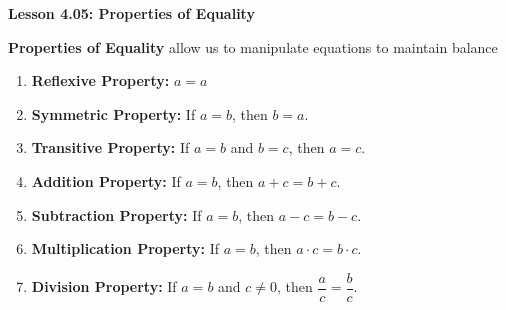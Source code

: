 \begin{center}
\textbf{Lesson 4.05: Properties of Equality}
\end{center}

\vspace*{-1.5ex}

\noindent \textbf{Properties of Equality} allow us to manipulate equations to maintain balance

\begin{enumerate}
    \item \textbf{Reflexive Property:} \(a = a\)  
    \item \textbf{Symmetric Property:} If \(a = b\), then \(b = a\).  
    \item \textbf{Transitive Property:} If \(a = b\) and \(b = c\), then \(a = c\).  
    \item \textbf{Addition Property:} If \(a = b\), then \(a + c = b + c\).  
    \item \textbf{Subtraction Property:} If \(a = b\), then \(a - c = b - c\).  
    \item \textbf{Multiplication Property:} If \(a = b\), then \(a \cdot c = b \cdot c\).  
    \item \textbf{Division Property:} If \(a = b\) and \(c \neq 0\), then \(\dfrac{a}{c} = \dfrac{b}{c}\).
\end{enumerate}
